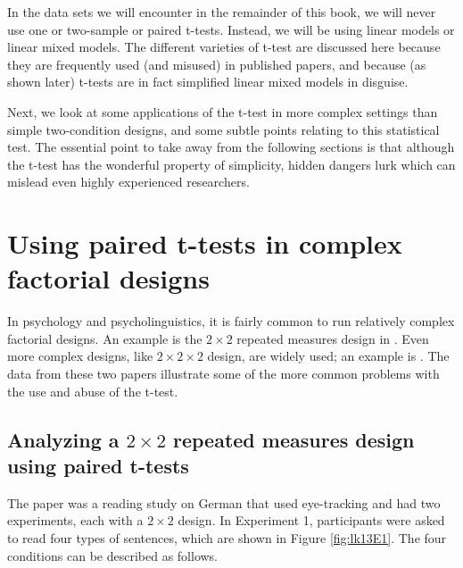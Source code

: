 \documentclass[
  12pt,
]{krantz}
\theoremstyle{definition}
\theoremstyle{definition}
\theoremstyle{definition}
\theoremstyle{definition}
\theoremstyle{remark}
\begin{document}
In the data sets we will encounter in the remainder of this book, we will never use one or two-sample or paired t-tests. Instead, we will be using linear models or linear mixed models. The different varieties of t-test are discussed here because they are frequently used (and misused) in published papers, and because (as shown later) t-tests are in fact simplified linear mixed models in disguise.

Next, we look at some applications of the t-test in more complex settings than simple two-condition designs, and some subtle points relating to this statistical test. The essential point to take away from the following sections is that although the t-test has the wonderful property of simplicity, hidden dangers lurk which can mislead even highly experienced researchers.

\hypertarget{using-paired-t-tests-in-complex-factorial-designs}{%
\section{Using paired t-tests in complex factorial designs}\label{using-paired-t-tests-in-complex-factorial-designs}}

In psychology and psycholinguistics, it is fairly common to run relatively complex factorial designs. An example is the \(2\times 2\) repeated measures design in \citet{levy2013expectation}. Even more complex designs, like \(2\times 2\times 2\) design, are widely used; an example is \citet{fedorenko2006nature}. The data from these two papers illustrate some of the more common problems with the use and abuse of the t-test.

\hypertarget{analyzing-a-2times-2-repeated-measures-design-using-paired-t-tests}{%
\subsection{\texorpdfstring{Analyzing a \(2\times 2\) repeated measures design using paired t-tests}{Analyzing a 2\textbackslash times 2 repeated measures design using paired t-tests}}\label{analyzing-a-2times-2-repeated-measures-design-using-paired-t-tests}}

The \citet{levy2013expectation} paper was a reading study on German that used eye-tracking and had two experiments, each with a \(2\times 2\) design. In Experiment 1, participants were asked to read four types of sentences, which are shown in Figure \ref{fig:lk13E1}. The four conditions can be described as follows.
\end{document}
